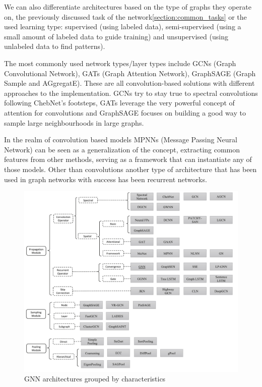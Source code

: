 	 We can also differentiate architectures based on the type of graphs they operate on, the previously discussed task of the network\ref{section:common_tasks} or the used learning type: supervised (using labeled data), semi-supervised (using a small amount of labeled data to guide training) and unsupervised (using unlabeled data to find patterns).
	 
	 The most commonly used network types/layer types include GCNs (Graph Convolutional Network), GATs (Graph Attention Network), GraphSAGE (Graph Sample and AGgregatE). These are all convolution-based solutions with different approaches to the implementation. GCNs try to stay true to spectral convolutions following ChebNet's footsteps, GATs leverage the very powerful concept of attention for convolutions and GraphSAGE focuses on building a good way to sample large neighbourhoods in large graphs.
	 
	 In the realm of convolution based models MPNNs (Message Passing Neural Network) can be seen as a generalization of the concept, extracting common features from other methods, serving as a framework that can instantiate any of those models. Other than convolutions another type of architecture that has been used in graph networks with success has been recurrent networks. 
	 
	 \begin{figure}[!h]
	 	\centering
	 	\includegraphics[width=\textwidth]{figures/gnn_types.jpg}
	 	\caption{GNN architectures grouped by characteristics\cite{gnn_review}}
	 \end{figure}
	
